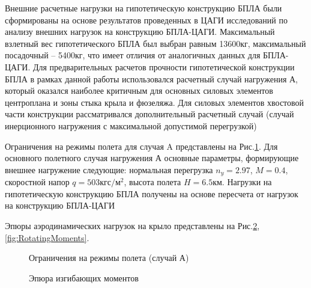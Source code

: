 Внешние расчетные нагрузки на гипотетическую конструкцию БПЛА были сформированы на основе результатов проведенных в ЦАГИ исследований \cite{BPS_TSAGI} по анализу внешних нагрузок на конструкцию БПЛА-ЦАГИ. Максимальный взлетный вес гипотетического БПЛА был выбран равным 13600кг, максимальный посадочный -- 5400кг, что имеет отличия от аналогичных данных для БПЛА-ЦАГИ. Для предварительных расчетов прочности гипотетической конструкции БПЛА в рамках данной работы использовался расчетный случай нагружения А, который оказался наиболее критичным для основных силовых элементов центроплана и зоны стыка крыла и фюзеляжа. Для силовых элементов хвостовой части конструкции рассматривался дополнительный расчетный случай (случай инерционного нагружения с максимальной допустимой перегрузкой) 



Ограничения на режимы полета для случая A представлены на Рис.\ref{fig:ModeOfFlight}. Для основного полетного случая нагружения А основные параметры, формирующие внешнее нагружение следующие: нормальная перегрузка $n_y = 2.97$, $M = 0.4$, скоростной напор $q = 503 \text{кгс}/\text{м}^2$, высота полета $H = 6.5\text{км}$. Нагрузки на гипотетическую конструкцию БПЛА получены на основе пересчета от нагрузок на конструкцию БПЛА-ЦАГИ


Эпюры аэродинамических нагрузок на крыло представлены на Рис.\ref{fig:BendingMoments},\ref{fig:RotatingMoments}.





\begin{figure}[H]
\centering
\def\svgwidth{0.9\textwidth}

\caption{Ограничения на режимы полета (случай А)}
\label{fig:ModeOfFlight}
\end{figure}


\begin{figure}[H]
\centering
\def\svgwidth{0.9\textwidth}

\caption{Эпюра изгибающих моментов}
\label{fig:BendingMoments}
\end{figure}


